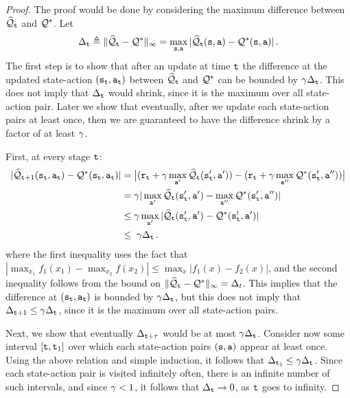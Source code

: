 \begin{proof}
The proof would be done by considering the maximum difference between $\widehat{\mathcal{Q}}_{\tt t}$ and $\mathcal{Q}^*$.
Let
\[
\Delta_{\tt t} \triangleq \|\widehat{\mathcal{Q}}_{\tt t}-\mathcal{Q}^*\|_\infty =
\max_{{\tt s},{\tt a}}
|\widehat{\mathcal{Q}}_{\tt t}({\tt s},{\tt a})-\mathcal{Q}^*({\tt s},{\tt a}) | \,.
\]
The first step is to show that after an update at time ${\tt t}$ the difference at the updated state-action $({\tt s}_{\tt t},{\tt a}_{\tt t})$ between $\widehat{\mathcal{Q}}_{\tt t}$ and $\mathcal{Q}^*$ can be bounded by $\gamma \Delta_{\tt t}$. This does not imply that $\Delta_{{\tt t}}$ would shrink, since it is the maximum over all state-action pair. Later we show that eventually, after we update each state-action pairs at least once, then we are guaranteed to have the difference shrink by a factor of at least $\gamma$. 

First, at every stage ${\tt t}$:
\begin{align*}
| \widehat{\mathcal{Q}}_{{\tt t}+1}({\tt s}_{\tt t},{\tt a}_{\tt t})-
\mathcal{Q}^*({\tt s}_{\tt t},{\tt a}_{\tt t})| &=
\big|({\tt r}_{\tt t}+\gamma\max_{{\tt a}'}
\widehat{\mathcal{Q}}_{\tt t}({\tt s}_{{\tt t}}',{\tt a}'))
- ({\tt r}_{\tt t}+\gamma\max_{{\tt a}''} \mathcal{Q}^*({\tt s}_{{\tt t}}',{\tt a}'') ) \big| \\
&= \gamma |\max_{{\tt a}'} \widehat{\mathcal{Q}}_{\tt t}({\tt s}_{{\tt t}}',{\tt a}') -\max_{{\tt a}''} \mathcal{Q}^*({\tt s}_{{\tt t}}',{\tt a}'') | \\
& \le \gamma \max_{{\tt a}'}
|\widehat{\mathcal{Q}}_{\tt t}({\tt s}_{{\tt t}}',{\tt a}') -
\mathcal{Q}^*({\tt s}_{{\tt t}}',{\tt a}') | \\
&\le\; \gamma \Delta_{\tt t}
\,.
\end{align*}
where the first inequality uses the fact that $|\max_{x_1} f_1(x_1)-\max_{x_2}f(x_2)|\leq \max_x|f_1(x)-f_2(x)|$, and the second inequality follows from the bound on $\|\widehat{\mathcal{Q}}_{\tt t}-\mathcal{Q}^*\|_\infty =\Delta_t $.
This implies that the difference at $({\tt s}_{\tt t},{\tt a}_{\tt t})$ is bounded by $\gamma\Delta_{\tt t}$, but this does not imply that $\Delta_{{\tt t}+1}\leq \gamma\Delta_{{\tt t}}$, since it is the maximum over all state-action pairs.

Next, we show that eventually $\Delta_{{\tt t}+\tau}$ would be at most $ \gamma\Delta_{{\tt t}}$.
Consider now some interval $[{\tt t},{\tt t}_1]$ over which each state-action pairs $({\tt s},{\tt a})$ appear at least once. Using the above relation and simple induction, it follows that $\Delta_{{\tt t}_1} \le \gamma \Delta_{{\tt t}}$.
%
Since each state-action pair is visited infinitely often, there is
an infinite number of such intervals, and since $\gamma<1$, it
follows that $\Delta_{\tt t} \to 0$, as ${\tt t}$ goes to infinity.
\end{proof}

